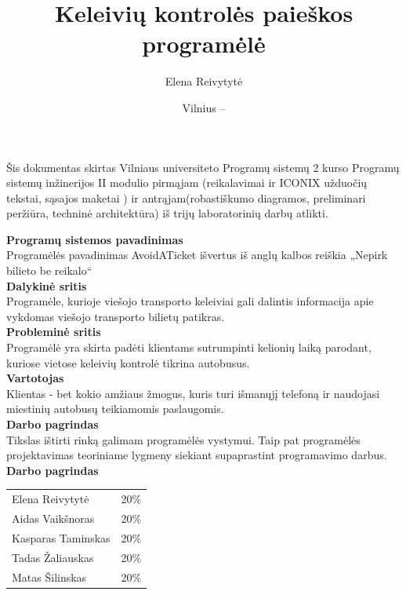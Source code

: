 \documentclass{VUMIFPSkursinis}
\title{Keleivių kontrolės paieškos programėlė}
\author{Elena Reivytytė}
\date{Vilnius – \the\year}
\begin{document}
\maketitle

Šis dokumentas skirtas Vilniaus universiteto Programų sistemų 2 kurso Programų sistemų inžinerijos II modulio pirmąjam (reikalavimai ir ICONIX užduočių tekstai, sąsajos maketai ) ir antrąjam(robastiškumo diagramos, preliminari peržiūra, techninė architektūra) iš trijų laboratorinių darbų atlikti.

\tableofcontents

\noindent
\textbf{Programų sistemos pavadinimas}\\
Programėlės pavadinimas AvoidATicket išvertus iš anglų kalbos reiškia „Nepirk bilieto be reikalo“\\
\textbf{Dalykinė sritis}\\
Programėle, kurioje viešojo transporto keleiviai gali dalintis informacija apie vykdomas viešojo transporto bilietų patikras.\\
\textbf{Probleminė sritis}\\
Programėlė yra skirta padėti klientams sutrumpinti kelionių laiką parodant, kuriose vietose keleivių kontrolė tikrina autobusus.\\
\textbf{Vartotojas}\\
Klientas - bet kokio amžiaus žmogus, kuris turi išmanųjį telefoną ir naudojasi miestinių autobusų teikiamomis paslaugomis.\\
\textbf{Darbo pagrindas}\\
Tikslas ištirti rinką galimam programėlės vystymui. Taip pat programėlės projektavimas teoriniame lygmeny siekiant supaprastint programavimo darbus.\\
\textbf{Darbo pagrindas}\\
\begin{tabular}{lr}
   Elena Reivytytė & 20\% \\
   Aidas Vaikšnoras & 20\% \\
   Kasparas Taminskas & 20\% \\
   Tadas Žaliauskas & 20\% \\
   Matas Šilinskas & 20\% \\
\end{tabular}
\end{document}

